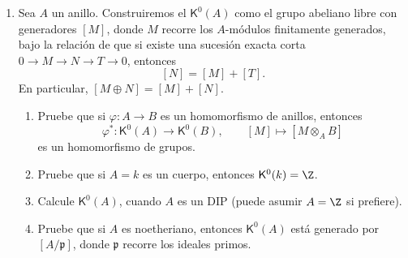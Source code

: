 \documentclass[11pt, reqno]{amsart}
\begin{document}
\begin{enumerate}
	\item Sea $A$ un anillo.
		Construiremos el  $\mathsf{K}^0(A)$ como el grupo abeliano libre con
		generadores $[M]$, donde $M$ recorre los $A$-módulos finitamente generados, bajo la relación de que si
		existe una sucesión exacta corta $0 \to M \to N \to T \to 0$, entonces
		\[
			[N] = [M] + [T].
		\]
		En particular, $[M\oplus N] = [M] + [N]$.
		\begin{enumerate}
			\item Pruebe que si $\varphi \colon A \to B$ es un homomorfismo de anillos, entonces
				\[
					\varphi^* \colon \mathsf{K}^0(A) \longrightarrow \mathsf{K}^0(B), \qquad
					[M] \longmapsto [M\otimes_A B]
				\]
				es un homomorfismo de grupos.
			\item Pruebe que si $A = k$ es un cuerpo, entonces $\mathsf{K}^0(k) = \Z$.
			\item\lookst
				Calcule $\mathsf{K}^0(A)$, cuando $A$ es un DIP (puede asumir $A = \Z$ si prefiere).

			\item Pruebe que si $A$ es noetheriano, entonces $\mathsf{K}^0(A)$ está generado por
				$[A/\mathfrak{p}]$, donde $\mathfrak{p}$ recorre los ideales primos.
		\end{enumerate}
\end{enumerate}

\appendix
\end{document}
